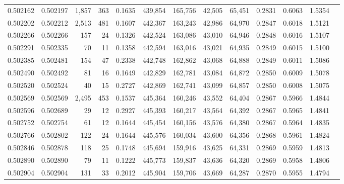 \begin{tabular}{rrrrrrrrrrrrr}
0.502162 & 0.502197 & 1,857 &   363 &                                     0.1635 & 439,854 & 165,756 &  42,505 &  65,451 & 0.2831 & 0.6063 & 1.5354 \\
0.502202 & 0.502212 & 2,513 &   481 &                                     0.1607 & 442,367 & 163,243 &  42,986 &  64,970 & 0.2847 & 0.6018 & 1.5121 \\
0.502266 & 0.502266 &   157 &    24 &                                     0.1326 & 442,524 & 163,086 &  43,010 &  64,946 & 0.2848 & 0.6016 & 1.5107 \\
0.502291 & 0.502335 &    70 &    11 &                                     0.1358 & 442,594 & 163,016 &  43,021 &  64,935 & 0.2849 & 0.6015 & 1.5100 \\
0.502385 & 0.502481 &   154 &    47 &                                     0.2338 & 442,748 & 162,862 &  43,068 &  64,888 & 0.2849 & 0.6011 & 1.5086 \\
0.502490 & 0.502492 &    81 &    16 &                                     0.1649 & 442,829 & 162,781 &  43,084 &  64,872 & 0.2850 & 0.6009 & 1.5078 \\
0.502520 & 0.502524 &    40 &    15 &                                     0.2727 & 442,869 & 162,741 &  43,099 &  64,857 & 0.2850 & 0.6008 & 1.5075 \\
0.502569 & 0.502569 & 2,495 &   453 &                                     0.1537 & 445,364 & 160,246 &  43,552 &  64,404 & 0.2867 & 0.5966 & 1.4844 \\
0.502596 & 0.502689 &    29 &    12 &                                     0.2927 & 445,393 & 160,217 &  43,564 &  64,392 & 0.2867 & 0.5965 & 1.4841 \\
0.502752 & 0.502754 &    61 &    12 &                                     0.1644 & 445,454 & 160,156 &  43,576 &  64,380 & 0.2867 & 0.5964 & 1.4835 \\
0.502766 & 0.502802 &   122 &    24 &                                     0.1644 & 445,576 & 160,034 &  43,600 &  64,356 & 0.2868 & 0.5961 & 1.4824 \\
0.502846 & 0.502878 &   118 &    25 &                                     0.1748 & 445,694 & 159,916 &  43,625 &  64,331 & 0.2869 & 0.5959 & 1.4813 \\
0.502890 & 0.502890 &    79 &    11 &                                     0.1222 & 445,773 & 159,837 &  43,636 &  64,320 & 0.2869 & 0.5958 & 1.4806 \\
0.502904 & 0.502904 &   131 &    33 &                                     0.2012 & 445,904 & 159,706 &  43,669 &  64,287 & 0.2870 & 0.5955 & 1.4794 \\

\end{tabular}
